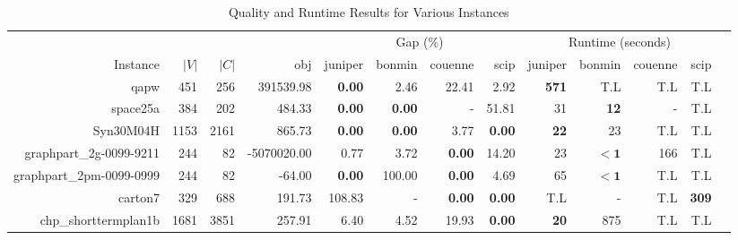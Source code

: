\begin{landscape} 
\begin{table*}[t] 
\footnotesize 
\caption{Quality and Runtime Results for Various Instances} 
\begin{tabular}{|r|r|r||r||r|r|r|r||r|r|r|r|r|} 
\hline 
                        &     &       &             & \multicolumn{4}{c||}{Gap (\%)} &  \multicolumn{4}{c|}{Runtime (seconds)} \\ 
    Instance              & $|V|$& $|C|$& obj         & juniper    & bonmin & couenne        & scip            & juniper          & bonmin            & couenne         & scip \\ 
    \hline 
    \hline 
                                qapw &           451 &           256 &                         391539.98 &  \textbf{0.00} &           2.46 &          22.41 &           2.92 &       \textbf{571} &                T.L &                T.L &                T.L \\ 
                            space25a &           384 &           202 &                            484.33 &  \textbf{0.00} &  \textbf{0.00} &              - &          51.81 &                 31 &        \textbf{12} &                  - &                T.L \\ 
                           Syn30M04H &          1153 &          2161 &                            865.73 &  \textbf{0.00} &  \textbf{0.00} &           3.77 &  \textbf{0.00} &        \textbf{22} &                 23 &                T.L &                T.L \\ 
             graphpart\_2g-0099-9211 &           244 &            82 &                       -5070020.00 &           0.77 &           3.72 &  \textbf{0.00} &          14.20 &                 23 &         $\bm{< 1}$ &                166 &                T.L \\ 
            graphpart\_2pm-0099-0999 &           244 &            82 &                            -64.00 &  \textbf{0.00} &         100.00 &  \textbf{0.00} &           4.69 &                 65 &         $\bm{< 1}$ &                T.L &                T.L \\ 
                             carton7 &           329 &           688 &                            191.73 &         108.83 &              - &  \textbf{0.00} &  \textbf{0.00} &                T.L &                  - &                T.L &       \textbf{309} \\ 
                chp\_shorttermplan1b &          1681 &          3851 &                            257.91 &           6.40 &           4.52 &          19.93 &  \textbf{0.00} &        \textbf{20} &                875 &                T.L &                T.L \\ 

\end{tabular}
\end{table*}
\end{landscape}
